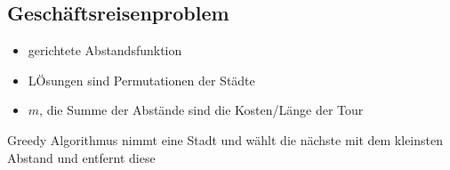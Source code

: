 \documentclass[ngerman]{scrartcl}
\begin{document}
\subsection*{Geschäftsreisenproblem}
\begin{itemize}
  \item gerichtete Abstandsfunktion
  \item LÖsungen sind Permutationen der Städte
  \item $ m $, die Summe der Abstände sind die Kosten/Länge der Tour
\end{itemize}
Greedy Algorithmus nimmt eine Stadt und wählt die nächste mit dem kleinsten Abstand und entfernt diese
\end{document}
